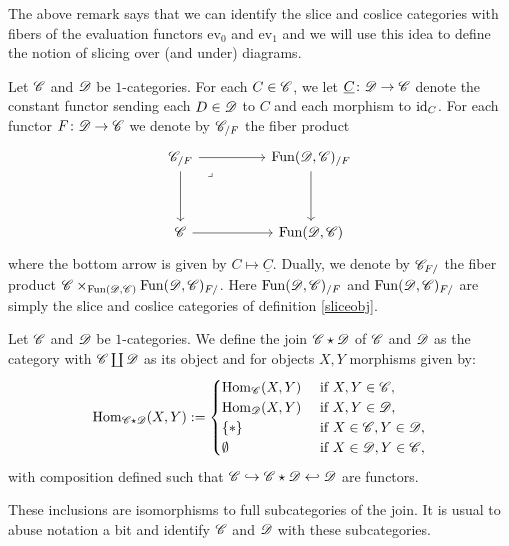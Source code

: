 \documentclass[../../thesis.tex]{subfiles}
\begin{document}
The above remark says that we can identify the slice and coslice categories with fibers of the evaluation functors $\mathrm{ev}_0$ and $\mathrm{ev}_1$ and we will use this idea to define the notion of slicing over (and under) diagrams.
\begin{definition}\label{slicefun}
    Let $\mathscr{C}$ and $\mathscr{D}$ be $1$-categories.
    For each $C\in \mathscr{C}$, we let $\underline{C} \colon \mathscr{D} \to \mathscr{C}$ denote the constant functor sending each $D\in \mathscr{D}$ to $C$ and each morphism to $\operatorname{id}_C$.
    For each functor $F\colon\mathscr{D}\to\mathscr{C}$ we denote by $\mathscr{C}_{/F}$ the fiber product
    \[\begin{tikzcd}
            {\C_{/F}} && {\Fun(\D,\C)_{/F}} \\
            \\
            \C && {\Fun(\D,\C)}
            \arrow[from=1-1, to=1-3]
            \arrow[from=1-1, to=3-1]
            \arrow[from=3-1, to=3-3]
            \arrow[from=1-3, to=3-3]
            \arrow["\lrcorner"{anchor=center, pos=0.125}, draw=none, from=1-1, to=3-3]
        \end{tikzcd}\]
    where the bottom arrow is given by $C \mapsto \underline{C}$.
    Dually, we denote by $\mathscr{C}_{F/}$ the fiber product ${\mathscr{C} \times_{\mathrm{Fun}(\mathscr{D},\mathscr{C})}\mathrm{Fun}(\mathscr{D},\mathscr{C})_{F/}}$.
    Here $\mathrm{Fun}(\mathscr{D},\mathscr{C})_{/F}$ and $\mathrm{Fun}(\mathscr{D},\mathscr{C})_{F/}$ are simply the slice and coslice categories of definition \ref{sliceobj}.
\end{definition}
\begin{definition}
    Let $\mathscr{C}$ and $\mathscr{D}$ be $1$-categories.
    We define the join $\mathscr{C} \star \mathscr{D}$ of $\mathscr{C}$ and $\mathscr{D}$ as the category with $\mathscr{C} \coprod \mathscr{D}$ as its object and for objects $X, Y$ morphisms given by:
    \[
        \mathrm{Hom}_{\mathscr{C} \star \mathscr{D}}(X,Y) : =
        \begin{cases}
            \mathrm{Hom}_{\mathscr{C}}(X,Y) & \text{ if } X,Y \in \mathscr{C},         \\
            \mathrm{Hom}_{\mathscr{D}}(X,Y) & \text{ if } X,Y \in \mathscr{D},         \\
            \{*\}          & \text{ if } X \in \mathscr{C}, Y \in \mathscr{D}, \\
            \emptyset      & \text{ if } X \in \mathscr{D}, Y\in \mathscr{C},
        \end{cases}
    \]
    with composition defined such that $\mathscr{C} \hookrightarrow \mathscr{C} \star \mathscr{D} \hookleftarrow \mathscr{D}$ are functors.
\end{definition}
\begin{remark}
    These inclusions are isomorphisms to full subcategories of the join.
    It is usual to abuse notation a bit and identify $\mathscr{C}$ and $\mathscr{D}$ with these subcategories.
\end{remark}
\end{document}
